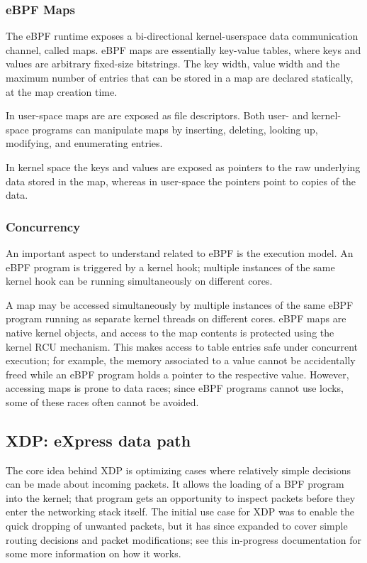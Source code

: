 \subsubsection{eBPF Maps}

The eBPF runtime exposes a bi-directional kernel-userspace data
communication channel, called maps.  eBPF maps are essentially
key-value tables, where keys and values are arbitrary fixed-size
bitstrings. The key width, value width and the maximum number of
entries that can be stored in a map are declared statically, at the
map creation time.

In user-space maps are are exposed as file descriptors. Both user- and
kernel-space programs can manipulate maps by inserting, deleting,
looking up, modifying, and enumerating entries.

In kernel space the keys and values are exposed as pointers to the raw
underlying data stored in the map, whereas in user-space the
pointers point to copies of the data.

\subsubsection{Concurrency}

An important aspect to understand related to eBPF is the execution
model. An eBPF program is triggered by a kernel hook; multiple
instances of the same kernel hook can be running simultaneously on
different cores.

A map may be accessed simultaneously by multiple instances of the same
eBPF program running as separate kernel threads on different cores.
eBPF maps are native kernel objects, and access to the map contents is
protected using the kernel RCU mechanism. This makes access to table
entries safe under concurrent execution; for example, the memory
associated to a value cannot be accidentally freed while an eBPF
program holds a pointer to the respective value.  However, accessing
maps is prone to data races; since eBPF programs cannot use locks,
some of these races often cannot be avoided.

\subsection{XDP: eXpress data path}

The core idea behind XDP is optimizing cases where relatively simple
decisions can be made about incoming packets. It allows the loading
of a BPF program into the kernel; that program gets an opportunity
to inspect packets before they enter the networking stack itself.
The initial use case for XDP was to enable the quick dropping of
unwanted packets, but it has since expanded to cover simple routing
decisions and packet modifications; see this in-progress documentation
for some more information on how it works.


